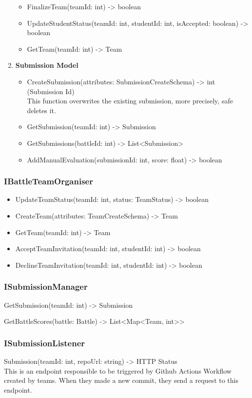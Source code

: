 \begin{enumerate}
\begin{itemize}
        \item FinalizeTeam(teamId: int) -> boolean
        \item UpdateStudentStatus(teamId: int, studentId: int, isAccepted: boolean) -> boolean
        \item GetTeam(teamId: int) -> Team
    \end{itemize}
    \item \textbf{Submission Model}
    \begin{itemize}
        \item CreateSubmission(attributes: SubmissionCreateSchema) -> int (Submission Id) \\
        This function overwrites the existing submission, more precisely, safe deletes it.
        \item GetSubmission(teamId: int) -> Submission
        \item GetSubmissions(battleId: int) -> List<Submission>
        \item AddManualEvaluation(submissionId: int, score: float) -> boolean
    \end{itemize}
\end{enumerate}
\subsubsection{IBattleTeamOrganiser}
\begin{itemize}
    \item UpdateTeamStatus(teamId: int, status: TeamStatus) -> boolean
    \item CreateTeam(attributes: TeamCreateSchema) -> Team
    \item GetTeam(teamId: int) -> Team
    \item AcceptTeamInvitation(teamId: int, studentId: int) -> boolean
    \item DeclineTeamInvitation(teamId: int, studentId: int) -> boolean
\end{itemize}
\subsubsection{ISubmissionManager}
    \item GetSubmission(teamId: int) -> Submission
    \item GetBattleScores(battle: Battle) -> List<Map<Team, int>>
\subsubsection{ISubmissionListener}
    \item Submission(teamId: int, repoUrl: string) -> HTTP Status \\
    This is an endpoint responsible to be triggered by Github Actions Workflow created by teams. When they made a new commit, they  send a request to this endpoint.
